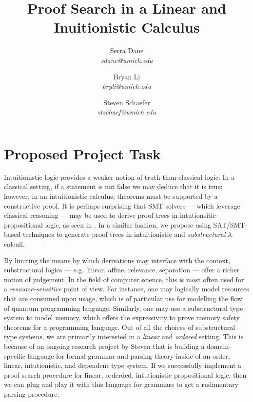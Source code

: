 \documentclass{article}
\begin{document}
\pagestyle{plain}

\pagebreak

\title{Proof Search in a Linear and Inuitionistic Calculus}

\author{Serra Dane \\ \textit{sdane@umich.edu} \and Bryan Li \\
  \textit{bryli@umich.edu} \and Steven Schaefer \\ \textit{stschaef@umich.edu}}

\maketitle

\section{Proposed Project Task}
Intuitionistic logic provides a weaker notion of truth than classical logic.
In a classical setting, if a statement is not false we may deduce that it is
true; however, in an intuitionistic calculus, theorems must be supported by a
constructive proof. It is perhaps surprising that SMT solvers --- which leverage
classical reasoning --- may be used to derive proof trees in intutionsitic
propositional logic, as seen in \cite{claessen2015sat}. In a similar fashion, we propose
using SAT/SMT-based techniques to generate proof trees in intuitionistic and
\emph{substructural} $\lambda$-calculi.

By limiting the means by which
derivations may interface with the context, substructural logics --- e.g.\
linear, affine, relevance, separation --- offer a richer notion of judgement. In
the field of computer science, this is most often used for a
\emph{resource-sensitive} point of view. For instance, one may logically model resources that are consumed upon usage, which is of particular use for modelling
the flow of quantum programming language. Similarly, one may use a substructural
type system to model memory, which offers the expressivity to prove memory
safety theorems for a programming language. Out of all the choices of substructural type systems, we are primarily
interested in a \emph{linear} and \emph{ordered} setting. This is because of an
ongoing research project by Steven that is building a domain-specific language for formal grammar and parsing theory
inside of an order, linear, intutionistic, and dependent type system. If we
successfully implement a proof search procedure for linear, orderded, intutionistic
propositional logic, then we can plug and play it with this language for
grammars to get a rudimentary parsing procedure.
\end{document}
